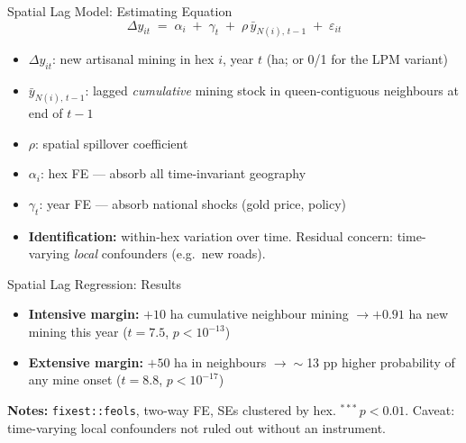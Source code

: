 \documentclass[aspectratio=169,handout]{beamer}
\newcommand{\srcnote}[1]{{\scriptsize\color{galagrey}#1}}
\begin{document}
\begin{frame}{Spatial Lag Model: Estimating Equation}
  \[
    \Delta y_{it} \;=\; \alpha_i \;+\; \gamma_t
      \;+\; \rho\,\bar{y}_{N(i),\,t-1} \;+\; \varepsilon_{it}
  \]
  \begin{itemize}\setlength\itemsep{0.4em}
    \item $\Delta y_{it}$: new artisanal mining in hex $i$, year $t$ (ha; or
          0/1 for the LPM variant)
    \item $\bar{y}_{N(i),\,t-1}$: lagged \emph{cumulative} mining stock in
          queen-contiguous neighbours at end of $t-1$
    \item $\rho$: spatial spillover coefficient
    \item $\alpha_i$: hex FE --- absorb all time-invariant geography
    \item $\gamma_t$: year FE --- absorb national shocks (gold price, policy)
    \item \textbf{Identification:} within-hex variation over time. Residual
          concern: time-varying \emph{local} confounders (e.g.\ new roads).
  \end{itemize}
\end{frame}

\begin{frame}{Spatial Lag Regression: Results}
  \begin{center}
    {\footnotesize}
  \end{center}
  \begin{itemize}\setlength\itemsep{0.35em}
    \item \textbf{Intensive margin:} $+10$ ha cumulative neighbour mining
          $\to +0.91$ ha new mining this year ($t=7.5$, $p<10^{-13}$)
    \item \textbf{Extensive margin:} $+50$ ha in neighbours $\to \sim$13 pp
          higher probability of any mine onset ($t=8.8$, $p<10^{-17}$)
  \end{itemize}
  \srcnote{\textbf{Notes:} \texttt{fixest::feols}, two-way FE, SEs clustered by
  hex. $^{***}\,p<0.01$. Caveat: time-varying local confounders not ruled out
  without an instrument.}
\end{frame}
\end{document}
